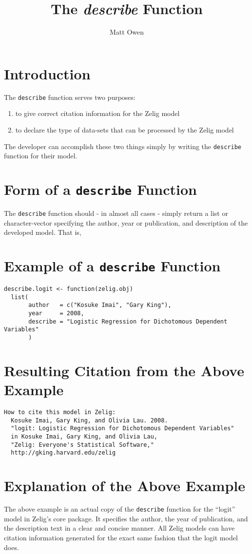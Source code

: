\documentclass[a4paper,10pt]{article}
\begin{document}
\title{The \emph{describe} Function}
\author{Matt Owen}
\maketitle

\section{Introduction}
The {\tt describe} function serves two purposes:

\begin{enumerate}
	\item{to give correct citation information for the Zelig model}
	\item{to declare the type of data-sets that can be processed by the Zelig model}
\end{enumerate}

The developer can accomplish these two things simply by writing the {\tt describe} function for their model.

\section{Form of a {\tt describe} Function}
The {\tt describe} function should - in almost all cases - simply return a list or character-vector specifying the author, year or publication, and description of the developed model.  That is, 

\section{Example of a {\tt describe} Function}
\begin{verbatim}
describe.logit <- function(zelig.obj)
  list(
       author   = c("Kosuke Imai", "Gary King"),
       year     = 2008,
       describe = "Logistic Regression for Dichotomous Dependent Variables"
       )
\end{verbatim}

\section{Resulting Citation from the Above Example}
\begin{verbatim}
How to cite this model in Zelig:
  Kosuke Imai, Gary King, and Olivia Lau. 2008.
  "logit: Logistic Regression for Dichotomous Dependent Variables"
  in Kosuke Imai, Gary King, and Olivia Lau,
  "Zelig: Everyone's Statistical Software,"
  http://gking.harvard.edu/zelig
\end{verbatim}

\section{Explanation of the Above Example}
The above example is an actual copy of the {\tt describe} function for the ``logit'' model in Zelig's core package.  It specifies the author, the year of publication, and the description text in a clear and concise manner.  All Zelig models can have citation information generated for the exact same fashion that the logit model does.
\end{document}

